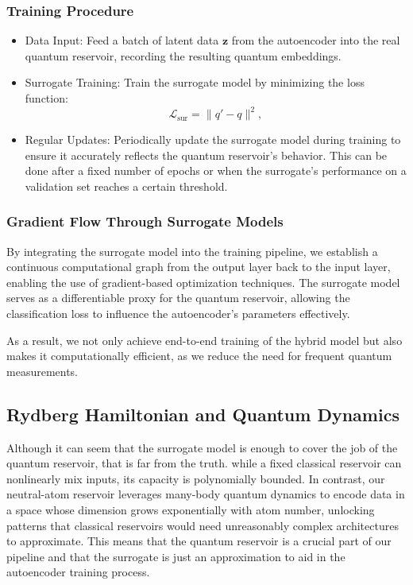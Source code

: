 \documentclass[conference]{IEEEtran}
\begin{document}
\subsubsection{Training Procedure}
\begin{itemize}
    \item Data Input: 
    Feed a batch of latent data \( \mathbf{z} \) from the autoencoder 
    into the real quantum reservoir, recording the resulting quantum 
    embeddings.

    \item Surrogate Training:
    Train the surrogate model  by minimizing the loss function:
    \begin{equation}
        \mathcal{L}_{\text{sur}} = \| q' - q \|^2,
    \end{equation}

    
    \item Regular Updates:
    Periodically update the surrogate model during training
    to ensure it accurately reflects the quantum reservoir's
    behavior. This can be done after a fixed number of epochs
    or when the surrogate's performance on a validation set
    reaches a certain threshold.
\end{itemize}

\subsubsection{Gradient Flow Through Surrogate Models}
By integrating the surrogate model into the training pipeline, 
we establish a continuous computational graph from the 
output layer back to the input layer, enabling the use of 
gradient-based optimization techniques. The surrogate model 
serves as a differentiable proxy for the quantum reservoir, 
allowing the classification loss to influence the 
autoencoder's parameters effectively.

As a result, we not only achieve end-to-end training of the
hybrid model but also makes it computationally efficient,
as we reduce the need for frequent quantum measurements.

\subsection{Rydberg Hamiltonian and Quantum Dynamics}
Although it can seem that the surrogate model is enough to cover the job of the quantum reservoir, that is far from the truth. while a fixed classical reservoir can nonlinearly mix inputs, its capacity is polynomially bounded. In contrast, our neutral-atom reservoir leverages many-body quantum dynamics to encode data in a space whose dimension grows exponentially with atom number, unlocking patterns that classical reservoirs would need unreasonably complex architectures to approximate. This means that the quantum reservoir is a crucial part of our pipeline and that the surrogate is just an approximation to aid in the autoencoder training process.
\end{document}
